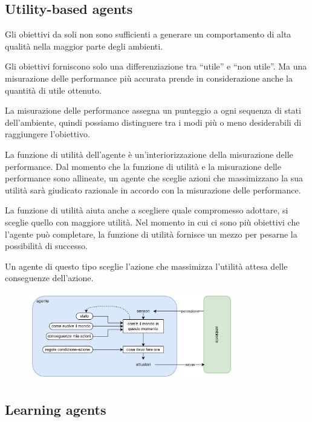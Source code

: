 \subsection{Utility-based agents}

Gli obiettivi da soli non sono sufficienti a generare un comportamento di alta qualità nella maggior parte degli ambienti.

Gli obiettivi forniscono solo una differenziazione tra “utile” e “non utile”. Ma una misurazione delle performance più accurata prende in considerazione anche la quantità di utile ottenuto.

La misurazione delle performance assegna un punteggio a ogni sequenza di stati dell'ambiente, quindi possiamo distinguere tra i modi più o meno desiderabili di raggiungere l'obiettivo.

La funzione di utilità dell'agente è un'interiorizzazione della misurazione delle performance.
Dal momento che la funzione di utilità e la misurazione delle performance sono allineate, un agente che sceglie azioni che massimizzano la sua utilità sarà giudicato razionale in accordo con la misurazione delle performance.

La funzione di utilità aiuta anche a scegliere quale compromesso adottare, si sceglie quello con maggiore utilità. Nel momento in cui ci sono più obiettivi che l'agente può completare, la funzione di utilità fornisce un mezzo per pesarne la possibilità di successo.

Un agente di questo tipo sceglie l'azione che massimizza l'utilità attesa delle conseguenze dell'azione.

\begin{figure}[H]
	\centering
	\includegraphics[width=0.8\textwidth]{capitoli/agenti-intelligenti/imgs/model-based.png}
\end{figure}

\subsection{Learning agents}


